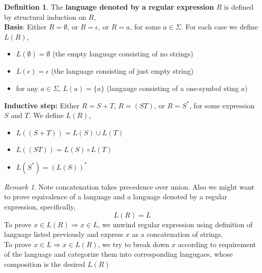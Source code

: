 \documentclass[11pt]{article}
\theoremstyle{plain}%
\theoremstyle{definition}
\newtheorem{defn}{Definition}
\theoremstyle{remark}
\newtheorem*{rem}{Remark}
\begin{document}
\begin{defn}
  The \textbf{language denoted by a regular expression} $R$ is defined by structural induction on $R$,\\
  \textbf{Basis}: Either $R=\emptyset$, or $R=\epsilon$, or $R=a$, for some $a\in\Sigma$. For each case we define $L(R)$,
  \begin{itemize}
    \item $L(\emptyset) = \emptyset$ (the empty language consisting of no strings)
    \item $L(\epsilon) = \epsilon$ (the language consisting of just empty string)
    \item for any $a\in \Sigma$, $L(a) = \{ a \}$ (langauge consisting of a one-symbol sting $a$)
  \end{itemize}
  \textbf{Inductive step:} Either $R = S+T$, $R = (ST)$, or $R=S^*$, for some expression $S$ and $T$. We define $L(R)$,
  \begin{itemize}
      \item $L((S+T)) = L(S)\cup L(T)$
      \item $L((ST)) = L(S)\circ L(T)$
      \item $L(S^*) = (L(S))^*$
  \end{itemize}

  \begin{rem}
    Note concatenation takes precedence over union. Also we might want to prove equivalence of a language and a language denoted by a regular expression, specifically,
    \[
      L(R) = L
    \]
    To prove $x\in L(R) \Rightarrow x\in L$, we unwind regular expression using definition of language listed previously and express $x$ as a concatenation of strings. \\
    To prove $x\in L \Rightarrow x\in L(R)$, we try to break down $x$ according to requirement of the language and categorize them into corresponding langugaes, whose composition is the desired $L(R)$
  \end{rem}
\end{defn}
\end{document}
